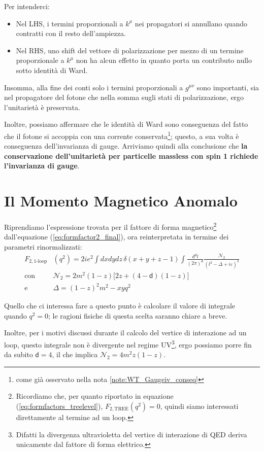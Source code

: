 \documentclass[../main.tex]{subfiles}
\begin{document}
Per intenderci:
\begin{itemize}
    \item Nel LHS, i termini proporzionali a \(k^\mu\) nei propagatori si annullano quando contratti con il resto dell'ampiezza.
    \item Nel RHS, uno shift del vettore di polarizzazione per mezzo di un termine proporzionale a \(k^\mu\) non ha alcun effetto in quanto porta un contributo nullo sotto identità di Ward.
\end{itemize}

Insomma, alla fine dei conti solo i termini proporzionali a \(g^{\mu\nu}\) sono importanti, sia nel propagatore del fotone che nella somma sugli stati di polarizzazione, ergo l'unitarietà è preservata.

Inoltre, possiamo affermare che le identità di Ward sono conseguenza del fatto che il fotone si accoppia con una corrente conservata\footnote{come già osservato nella nota \ref{note:WT_Gaugeiv_conseq}}; questo, a sua volta è conseguenza dell'invarianza di gauge. Arriviamo quindi alla conclusione che \textbf{la conservazione dell'unitarietà per particelle massless con spin 1 richiede l'invarianza di gauge}.

\section{Il Momento Magnetico Anomalo}
Riprendiamo l'espressione trovata per il fattore di forma magnetico\footnote{Ricordiamo che, per quanto riportato in equazione (\ref{eq:formfactors_treelevel}), \(F_{2, \text{TREE}}(q^2) = 0\), quindi siamo interessati direttamente al termine ad un loop.} dall'equazione (\ref{eq:formfactor2_final}), ora reinterpretata in termine dei parametri rinormalizzati:
\[
\begin{aligned}
    F_{2,\text{1-loop}}&(q^2) = 2ie^2\int dxdydz \,\delta(x+y+z-1) \int \frac{d^\mathsf d l}{(2\pi)^\mathsf d} \frac{\mathscr{N}_2}{(l^2-\Delta+i\varepsilon)^3}\\
    \text{con }&\mathscr{N}_2 = 2m^2(1-z)\bigl[ 2z + (4-\mathsf d)(1-z) \bigr]\\
    \text{e }& \Delta = (1-z)^2m^2 -xyq^2
\end{aligned}
\]

Quello che ci interessa fare a questo punto è calcolare il valore di integrale quando \(q^2=0\); le ragioni fisiche di questa scelta saranno chiare a breve.

Inoltre, per i motivi discussi durante il calcolo del vertice di interazione ad un loop, questo integrale non è divergente nel regime UV\footnote{Difatti la divergenza ultravioletta del vertice di interazione di QED deriva unicamente dal fattore di forma elettrico.}, ergo possiamo porre fin da subito \(\mathsf d = 4\), il che implica \(\boxed{\mathscr{N}_2 = 4m^2z(1-z)}\).
\end{document}
